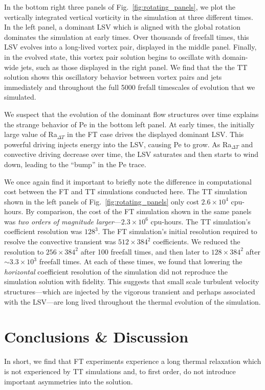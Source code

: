 \documentclass[aps, pre, onecolumn, nofootinbib, notitlepage, groupedaddress, amsfonts, amssymb, amsmath, longbibliography, superscriptaddress]{revtex4-1}
\begin{document}
In the bottom right three panels of Fig.~\ref{fig:rotating_panels}, we plot the vertically integrated vertical vorticity in the simulation at three different times.
In the left panel, a dominant LSV which is aligned with the global rotation dominates the simulation at early times.
Over thousands of freefall times, this LSV evolves into a long-lived vortex pair, displayed in the middle panel.
Finally, in the evolved state, this vortex pair solution begins to oscillate with domain-wide jets, such as those displayed in the right panel.
We find that the the TT solution shows this oscillatory behavior between vortex pairs and jets immediately and throughout the full 5000 frefall timescales of evolution that we simulated.

We suspect that the evolution of the dominant flow structures over time explains the strange behavior of Pe in the bottom left panel.
At early times, the initially large value of Ra$_{\Delta T}$ in the FT case drives the displayed dominant LSV.
This powerful driving injects energy into the LSV, causing Pe to grow.
As Ra$_{\Delta T}$ and convective driving decrease over time, the LSV saturates and then starts to wind down, leading to the ``bump'' in the Pe trace.

We once again find it important to briefly note the difference in computational cost between the FT and TT simulations conducted here.
The TT simulation shown in the left panels of Fig.~\ref{fig:rotating_panels} only cost $2.6 \times 10^4$ cpu-hours.
By comparison, the cost of the FT simulation shown in the same panels was \emph{two orders of magnitude larger}---$2.3 \times 10^6$ cpu-hours.
The TT simulation's coefficient resolution was $128^3$.
The FT simulation's initial resolution required to resolve the convective transient was $512\times384^2$ coefficients.
We reduced the resolution to $256\times384^2$ after 100 freefall times, and then later to $128\times384^2$ after $\sim3.3 \times 10^3$ freefall times.
At each of these times, we found that lowering the \emph{horizontal} coefficient resolution of the simulation did not reproduce the simulation solution with fidelity.
This suggests that small scale turbulent velocity structures---which are injected by the vigorous transient and perhaps associated with the LSV---are long lived throughout the thermal evolution of the simulation.



\section{Conclusions \& Discussion}
\label{sec:discussion}
In short, we find that FT experiments experience a long thermal relaxation which is not experienced by TT simulations and, to first order, do not introduce important asymmetries into the solution.
\end{document}

